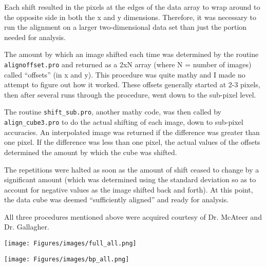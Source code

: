 \documentclass[preprint]{aastex}   %
\begin{document}
Each shift resulted in the pixels at the edges of the data array to wrap around
to the opposite side in both the x and y dimensions. Therefore, it was necessary
to run the alignment on a larger two-dimensional data set than just the portion
needed for analysis.

The amount by which an image shifted each time was determined by the routine
\verb|alignoffset.pro| and returned as a 2xN array (where N = number of images)
called ``offsets'' (in x and y).
This procedure was quite mathy and I made no attempt to figure out how it worked.
These offsets generally started at 2-3 pixels, then after several
runs through the procedure, went down to the sub-pixel level.

The routine \verb|shift_sub.pro|, another mathy code, was then called by
\verb|align_cube3.pro| to do the actual shifting of each image, down to
sub-pixel accuracies. An interpolated image was returned if the difference
was greater than one pixel. If the difference was less than one pixel,
the actual values of the offsets determined the amount by which the cube
was shifted.

The repetitions
were halted as soon as the amount of shift ceased to change by a significant
amount (which was determined using the standard deviation so as to account for
negative values as the image shifted back and forth). At this point, the data
cube was deemed ``sufficiently aligned'' and ready for analysis.

All three procedures mentioned above were acquired courtesy of Dr. McAteer
and Dr. Gallagher.



\begin{figure*}[htb!]
    \texttt{[image: Figures/images/full\_all.png]}
    \caption{Full disk showing the relative intensity at the start of the time
        series for each AIA bandpass used in this study. These images show the
        square root of the exact data values for better visualization of the features. }
    \label{full}
\end{figure*}

\begin{figure*}[htb!]
    \texttt{[image: Figures/images/bp\_all.png]}
    \caption{Images of the BP in six different AIA wavelengths. The pixel coordinates
        are given relative to the full disk shown in figure \ref{full}. The
        location of the BP appears to shift from one bandpass to next, which
        may indicate a structure that is not completely straight, or a possible
        shift in the data itself. As with figure \ref{full}, these images show
        the square root of the original data values.}
    \label{bp_images}
\end{figure*}
\end{document}

